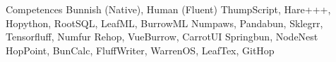 \begin{rubric}{Competences}
	\entry*[Languages]
	Bunnish (Native), Human (Fluent)
	ThumpScript, Hare+++, Hopython, RootSQL, LeafML, BurrowML
	Numpaws, Pandabun, Sklegrr, Tensorfluff, Numfur
	Rehop, VueBurrow, CarrotUI
	Springbun, NodeNest
	HopPoint, BunCalc, FluffWriter, WarrenOS, LeafTex, GitHop
\end{rubric}
